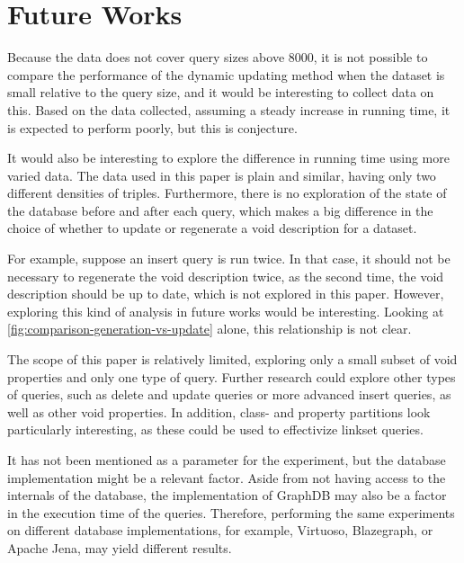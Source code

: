 \section{Future Works}\label{sec:future-works}
Because the data does not cover query sizes above 8000, it is not possible to compare the performance of the dynamic updating method when the dataset is small relative to the query size, and it would be interesting to collect data on this. Based on the data collected, assuming a steady increase in running time, it is expected to perform poorly, but this is conjecture.

It would also be interesting to explore the difference in running time using more varied data. The data used in this paper is plain and similar, having only two different densities of triples. Furthermore, there is no exploration of the state of the database before and after each query, which makes a big difference in the choice of whether to update or regenerate a \gls{void} description for a dataset.

For example, suppose an insert query is run twice. In that case, it should not be necessary to regenerate the \gls{void} description twice, as the second time, the \gls{void} description should be up to date, which is not explored in this paper. However, exploring this kind of analysis in future works would be interesting. Looking at \autoref{fig:comparison-generation-vs-update} alone, this relationship is not clear.

The scope of this paper is relatively limited, exploring only a small subset of \gls{void} properties and only one type of query. Further research could explore other types of queries, such as delete and update queries or more advanced insert queries, as well as other \gls{void} properties. In addition, class- and property partitions look particularly interesting, as these could be used to effectivize linkset queries.

It has not been mentioned as a parameter for the experiment, but the database implementation might be a relevant factor. Aside from not having access to the internals of the database, the implementation of GraphDB may also be a factor in the execution time of the queries. Therefore, performing the same experiments on different database implementations, for example, Virtuoso, Blazegraph, or Apache Jena, may yield different results.